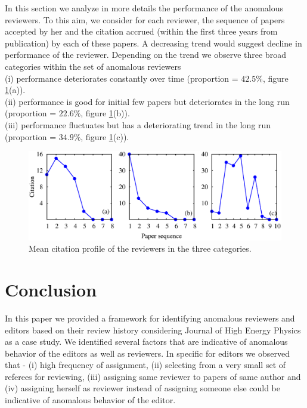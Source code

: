 In this section we analyze in more details the performance of the anomalous reviewers. To this aim, we consider for each reviewer, the sequence of papers accepted by her and the citation accrued (within the first three years from publication) by each of these papers. A decreasing trend would suggest decline in performance of the reviewer. Depending on the trend we observe three broad categories within the set of anomalous reviewers \\
(i) performance deteriorates constantly over time (proportion = $42.5\%$, figure \ref{cit_prof}(a)).\\
(ii) performance is good for initial few papers but deteriorates in the long run (proportion = $22.6\%$, figure \ref{cit_prof}(b)).\\
(iii) performance fluctuates but has a deteriorating trend in the long run (proportion = $34.9\%$, figure \ref{cit_prof}(c)).
\begin{figure}
\centering
\includegraphics[scale=0.4]{./texfiles/Chapter_4/cikm/figures/profile_all.eps}
\caption{\label{cit_prof} Mean citation profile of the reviewers in the three categories.}
\end{figure}

%

\section{Conclusion}
\label{conclusion}

In this paper we provided a framework for identifying anomalous reviewers and editors based on  their review history considering Journal of High Energy Physics as a case study. We identified several factors that are indicative of anomalous behavior of the editors as well as reviewers. In specific for editors we observed that - 
(i) high frequency of assignment, (ii) selecting from a very small set of referees for reviewing, (iii) assigning same reviewer to papers of same author and (iv) assigning herself as reviewer instead of assigning someone else could be indicative of anomalous behavior of the editor. 

